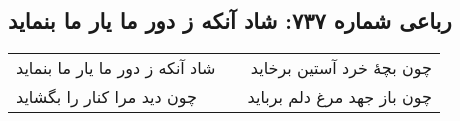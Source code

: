 \begin{center}
\section*{رباعی شماره ۷۳۷: شاد آنکه ز دور ما یار ما بنماید}
\label{sec:0737}
\begin{longtable}{l p{0.5cm} r}
شاد آنکه ز دور ما یار ما بنماید
&&
چون بچهٔ خرد آستین برخاید
\\
چون دید مرا کنار را بگشاید
&&
چون باز جهد مرغ دلم برباید
\\
\end{longtable}
\end{center}
